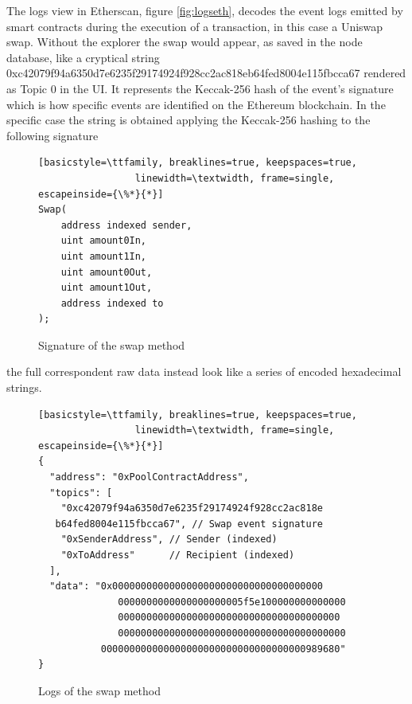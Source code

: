 \documentclass[11pt,a4paper,titlepage]{scrartcl}
\begin{document}
The logs view in Etherscan, figure  \ref{fig:logseth}, decodes the event logs emitted by smart contracts during the execution of a transaction, in this case a Uniswap swap.  Without the explorer the swap would appear, as saved in the node database,  like a cryptical string \\
0xc42079f94a6350d7e6235f29174924f928cc2ac818eb64fed8004e115fbcca67 rendered as Topic 0 in the UI. It  represents the Keccak-256 hash of the event’s signature which  is how specific events are identified on the Ethereum blockchain.
In the specific case the string is obtained applying the Keccak-256 hashing to the following signature

\begin{figure}[ht]
\centering
\begin{lstlisting}[basicstyle=\ttfamily, breaklines=true, keepspaces=true, 
                 linewidth=\textwidth, frame=single, escapeinside={\%*}{*}]
Swap(
    address indexed sender,
    uint amount0In,
    uint amount1In,
    uint amount0Out,
    uint amount1Out,
    address indexed to
);
\end{lstlisting}
\caption{Signature of the swap method}
\label{lst:swap_event}
\end{figure}


the full correspondent raw data instead look like a series of encoded hexadecimal strings. 


\begin{figure}[H]
\centering
\begin{lstlisting}[basicstyle=\ttfamily, breaklines=true, keepspaces=true, 
                 linewidth=\textwidth, frame=single, escapeinside={\%*}{*}]
{
  "address": "0xPoolContractAddress",
  "topics": [
    "0xc42079f94a6350d7e6235f29174924f928cc2ac818e
   b64fed8004e115fbcca67", // Swap event signature
    "0xSenderAddress", // Sender (indexed)
    "0xToAddress"      // Recipient (indexed)
  ],
  "data": "0x0000000000000000000000000000000000000
              0000000000000000000005f5e100000000000000
              000000000000000000000000000000000000000
              0000000000000000000000000000000000000000
           000000000000000000000000000000000000989680"
}
\end{lstlisting}
\caption{Logs of the swap method}
\label{lst:swap_event_log}
\end{figure}
\end{document}

